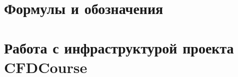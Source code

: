 \documentclass[a4paper,12pt]{article}
\numberwithin{equation}{section}
\begin{document}
\newpage
\tableofcontents
\newpage






























\appendix
\section{Формулы и обозначения}





\section{Работа с инфраструктурой проекта CFDCourse}





\end{document}
